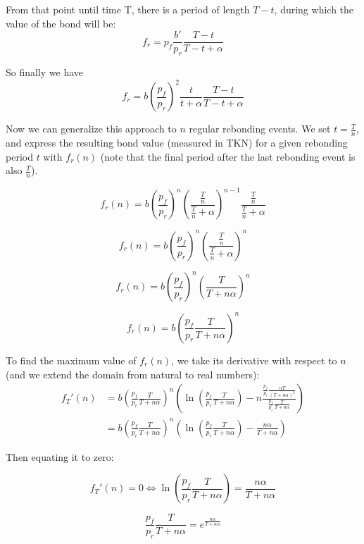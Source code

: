 \documentclass{article}
\begin{document}
From that point until time T, there is a period of length $T-t$, during which the value of the bond will be:
\begin{equation}
f_r = p_f\frac{b'}{p_r}\frac{T-t}{T-t+\alpha}
\end{equation}

So finally we have
\begin{equation}
  \label{eq:o-r}
f_r = b\left(\frac{p_f}{p_r}\right)^2\frac{t}{t+\alpha}\frac{T-t}{T-t+\alpha}
\end{equation}

Now we can generalize this approach to $n$ regular rebonding events. We set $t=\frac{T}{n}$, and express the resulting bond value (measured in TKN) for a given rebonding period $t$ with $f_r(n)$ (note that the final period after the last rebonding event is also $\frac{T}{n}$).

\[
f_r(n) = b \left(\frac{p_f}{p_r}\right)^n \left(\frac{\frac{T}{n}}{\frac{T}{n}+\alpha}\right)^{n-1} \frac{\frac{T}{n}}{\frac{T}{n}+\alpha}
\]

\[
f_r(n) = b \left(\frac{p_f}{p_r}\right)^n \left(\frac{\frac{T}{n}}{\frac{T}{n}+\alpha}\right)^{n}
\]

\[
f_r(n) = b \left(\frac{p_f}{p_r}\right)^n \left(\frac{T}{T + n\alpha}\right)^{n}
\]

\begin{equation}
  \label{eq:n-rebond_1}
f_r(n) = b \left(\frac{p_f}{p_r} \frac{T}{T+n \alpha} \right)^{n}
\end{equation}

To find the maximum value of $f_r(n)$, we take its derivative with respect to $n$ (and we extend the domain from natural to real numbers):
\[
\begin{split}
  f_T'(n) &= b \left(\frac{p_f}{p_r} \frac{T}{T+n\alpha}\right)^n \left(\ln\left(\frac{p_f}{p_r} \frac{T}{T+n\alpha}\right) - n \frac{\frac{p_f}{p_r} \frac{\alpha T}{(T+n\alpha)^2}}{\frac{p_f}{p_r} \frac{T}{T+n\alpha}}\right) \\
  &= b \left(\frac{p_f}{p_r} \frac{T}{T+n\alpha}\right)^n \left(\ln\left(\frac{p_f}{p_r} \frac{T}{T+n\alpha}\right) - \frac{n\alpha}{T+n\alpha}\right)
\end{split}
\]

Then equating it to zero:

\[
f_T'(n) = 0 \iff \ln\left(\frac{p_f}{p_r} \frac{T}{T+n\alpha}\right) = \frac{n\alpha}{T+n\alpha}
\]

\[
\frac{p_f}{p_r} \frac{T}{T+n\alpha} = e^{\frac{n\alpha}{T+n\alpha}}
\]
\end{document}
